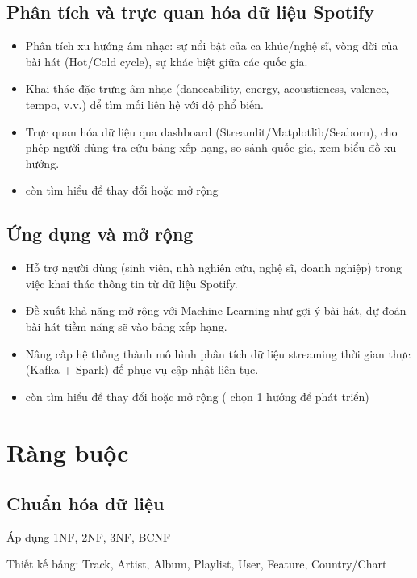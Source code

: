 \documentclass{latex/hcmut-report}
\begin{document}
\subsection{Phân tích và trực quan hóa dữ liệu Spotify}
\begin{itemize}
    \item Phân tích xu hướng âm nhạc: sự nổi bật của ca khúc/nghệ sĩ, vòng đời của bài hát (Hot/Cold cycle), sự khác biệt giữa các quốc gia.
    \item Khai thác đặc trưng âm nhạc (danceability, energy, acousticness, valence, tempo, v.v.) để tìm mối liên hệ với độ phổ biến.
    \item Trực quan hóa dữ liệu qua dashboard (Streamlit/Matplotlib/Seaborn), cho phép người dùng tra cứu bảng xếp hạng, so sánh quốc gia, xem biểu đồ xu hướng.
    \item còn tìm hiểu để thay đổi hoặc mở rộng
\end{itemize}

\subsection{Ứng dụng và mở rộng}
\begin{itemize}
    \item Hỗ trợ người dùng (sinh viên, nhà nghiên cứu, nghệ sĩ, doanh nghiệp) trong việc khai thác thông tin từ dữ liệu Spotify.
    \item Đề xuất khả năng mở rộng với Machine Learning như gợi ý bài hát, dự đoán bài hát tiềm năng sẽ vào bảng xếp hạng.
    \item Nâng cấp hệ thống thành mô hình phân tích dữ liệu streaming thời gian thực (Kafka + Spark) để phục vụ cập nhật liên tục.
    \item còn tìm hiểu để thay đổi hoặc mở rộng ( chọn 1 hướng để phát triển)
\end{itemize}






\section{Ràng buộc}

\subsection{Chuẩn hóa dữ liệu}
Áp dụng 1NF, 2NF, 3NF, BCNF

Thiết kế bảng: Track, Artist, Album, Playlist, User, Feature, Country/Chart
\end{document}
